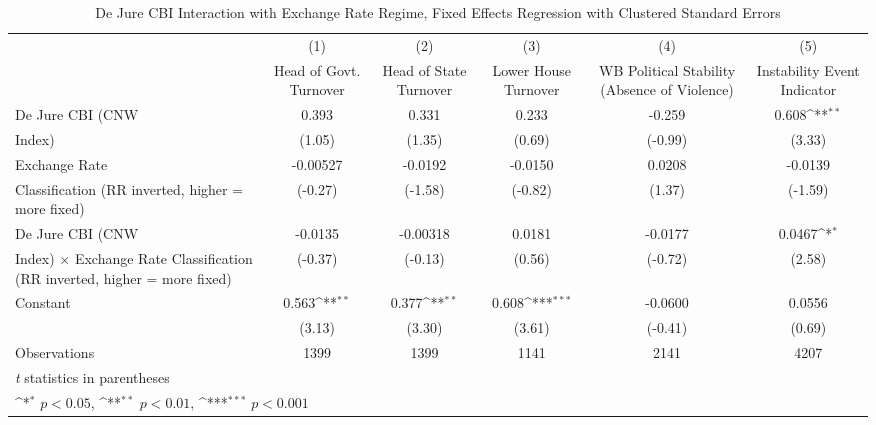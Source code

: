 \begin{table}[htbp]\centering
\def\sym#1{\ifmmode^{#1}\else\(^{#1}\)\fi}
\caption{De Jure CBI Interaction with Exchange Rate Regime, Fixed Effects Regression with Clustered Standard Errors \label{imultIndFEDJ}}
\begin{tabular}{l*{5}{c}}
\toprule
                &\multicolumn{1}{c}{(1)}&\multicolumn{1}{c}{(2)}&\multicolumn{1}{c}{(3)}&\multicolumn{1}{c}{(4)}&\multicolumn{1}{c}{(5)}\\
                &\multicolumn{1}{c}{Head of Govt. Turnover}&\multicolumn{1}{c}{Head of State Turnover}&\multicolumn{1}{c}{Lower House Turnover}&\multicolumn{1}{c}{WB Political Stability (Absence of Violence)}&\multicolumn{1}{c}{Instability Event Indicator}\\
\midrule
De Jure CBI (CNW&    0.393         &    0.331         &    0.233         &   -0.259         &    0.608\sym{**} \\
Index)          &   (1.05)         &   (1.35)         &   (0.69)         &  (-0.99)         &   (3.33)         \\
\addlinespace
Exchange Rate   & -0.00527         &  -0.0192         &  -0.0150         &   0.0208         &  -0.0139         \\
Classification (RR inverted, higher = more fixed)&  (-0.27)         &  (-1.58)         &  (-0.82)         &   (1.37)         &  (-1.59)         \\
\addlinespace
De Jure CBI (CNW&  -0.0135         & -0.00318         &   0.0181         &  -0.0177         &   0.0467\sym{*}  \\
Index) $\times$ Exchange Rate Classification (RR inverted, higher = more fixed)&  (-0.37)         &  (-0.13)         &   (0.56)         &  (-0.72)         &   (2.58)         \\
\addlinespace
Constant        &    0.563\sym{**} &    0.377\sym{**} &    0.608\sym{***}&  -0.0600         &   0.0556         \\
                &   (3.13)         &   (3.30)         &   (3.61)         &  (-0.41)         &   (0.69)         \\
\midrule
Observations    &     1399         &     1399         &     1141         &     2141         &     4207         \\
\bottomrule
\multicolumn{6}{l}{\footnotesize \textit{t} statistics in parentheses}\\
\multicolumn{6}{l}{\footnotesize \sym{*} \(p<0.05\), \sym{**} \(p<0.01\), \sym{***} \(p<0.001\)}\\
\end{tabular}
\end{table}
